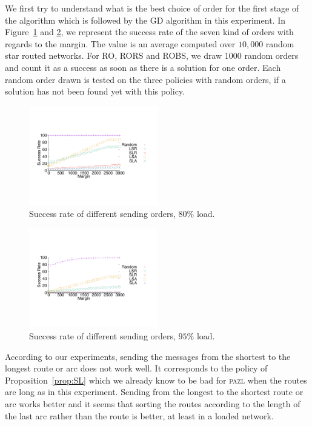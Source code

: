 \documentclass[10pt, conference, letterpaper]{IEEEtran}
\newcommand\pazl{\textsc{pazl}\xspace}
\begin{document}
   We first try to understand what is the best choice of order for the first stage of the algorithm which is followed by the GD algorithm in this experiment. In Figure~\ref{fig:success80} and \ref{fig:success95}, we represent the success rate of the seven kind of orders with regards to the margin. The value is an average computed over $10,000$ random star routed networks. For RO, RORS and ROBS, we draw $1000$ random orders and count it as a success as soon as there is a solution for one order. Each random order drawn is tested on the three policies with random orders, if a solution has not been found yet with this policy.

\begin{figure}[h] 
  \centering
          \includegraphics[width=0.5\textwidth]{departs_gp_25000.pdf}
      \caption{Success rate of different sending orders, $80\%$ load.}
           \label{fig:success80}
     \end{figure}
     
\begin{figure}[h] 
  \centering
    \includegraphics[width=0.5\textwidth]{departs_gp_21000.pdf}
      \caption{Success rate of different sending orders, $95\%$ load.}
      \label{fig:success95}
          \end{figure}

     According to our experiments, sending the messages from the shortest to the longest route or arc does not work well. It corresponds to the policy of Proposition~\ref{prop:SL} which we already know to be bad for \pazl when the routes are long as in this experiment. Sending from the longest to the shortest route or arc works better and it seems that sorting the routes according to the length of the last arc rather than the route is better, at least in a loaded network. 
     
\end{document}
